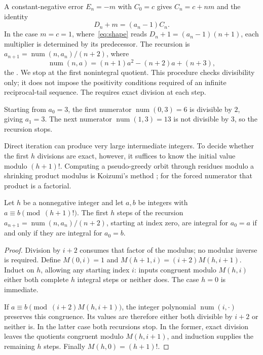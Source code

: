 \documentclass[11pt]{article}
\newcommand{\fnum}{\operatorname{num}}
\begin{document}
A constant-negative error $E_n=-m$ with $C_0=c$ gives $C_n=c+nm$ and the identity
\begin{equation}\label{eq:shape}
 D_n+m=(a_n-1)C_n.
\end{equation}
In the case $m=c=1$, where~\eqref{eq:shape} reads $D_n+1=(a_n-1)(n+1)$, each
multiplier is determined by its predecessor. The recursion is
$a_{n+1}=\fnum(n,a_n)/(n+2)$, where
\[
 \fnum(n,a)=(n+1)a^{2}-(n+2)a+(n+3),
\]
the
. We stop at the first nonintegral quotient. This procedure
checks divisibility only; it does not impose the positivity conditions
required of an infinite reciprocal-tail sequence. The
requires exact division at each step.
\begin{example}\label{ex:shape}
Starting from $a_0=3$, the first numerator $\fnum(0,3)=6$ is
divisible by $2$, giving $a_1=3$. The next numerator
$\fnum(1,3)=13$ is not divisible by $3$, so the recursion stops.
\end{example}
Direct iteration can produce very large intermediate integers. To
decide whether the first $h$ divisions are exact, however, it suffices
to know the initial value modulo $(h+1)!$.
Computing a pseudo-greedy orbit through residues modulo a shrinking product
modulus is Koizumi's method \cite[Remark~2 and Algorithm~1,
pp.~13--14]{koizumi2025}; for the forced numerator that product is a
factorial.

\begin{theorem}\label{res:residue}
Let $h$ be a nonnegative integer and let $a,b$ be integers with $a\equiv b\pmod{(h+1)!}$.
The first $h$ steps of the recursion
$a_{n+1}=\fnum(n,a_n)/(n+2)$, starting at index zero, are integral
for $a_0=a$ if and only if they are integral for $a_0=b$.
\end{theorem}

\begin{proof}
Division by $i+2$ consumes that factor of the modulus; no modular
inverse is required. Define $M(0,i)=1$ and
$M(h+1,i)=(i+2)M(h,i+1)$. Induct on $h$, allowing any starting
index $i$: inputs congruent modulo $M(h,i)$ either both complete
$h$ integral steps or neither does. The case $h=0$ is immediate.

If $a\equiv b\pmod{(i+2)M(h,i+1)}$, the integer polynomial
$\fnum(i,\cdot)$ preserves this congruence. Its values are therefore
either both divisible by $i+2$ or neither is. In the latter case both
recursions stop. In the former, exact division leaves the quotients
congruent modulo $M(h,i+1)$, and induction supplies the remaining
$h$ steps. Finally $M(h,0)=(h+1)!$.
\end{proof}
\end{document}
